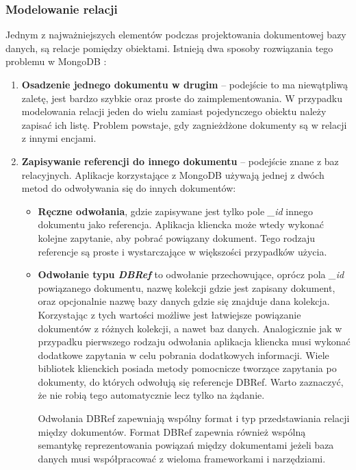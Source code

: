 \subsubsection{Modelowanie relacji}

Jednym z najważniejszych elementów podczas projektowania dokumentowej bazy danych, są relacje pomiędzy obiektami.
Istnieją dwa sposoby rozwiązania tego problemu w MongoDB \cite{MongoDBRefs}:
\begin{enumerate}
    \item \textbf{Osadzenie jednego dokumentu w drugim} -- podejście to ma niewątpliwą zaletę, jest bardzo szybkie oraz proste do zaimplementowania.
    W przypadku modelowania relacji jeden do wielu zamiast pojedynczego obiektu należy zapisać ich listę.
    Problem powstaje, gdy zagnieżdżone dokumenty są w relacji z innymi encjami.
    \item \textbf{Zapisywanie referencji do innego dokumentu} -- podejście znane z baz relacyjnych.
    Aplikacje korzystające z MongoDB używają jednej z dwóch metod do odwoływania się do innych dokumentów:
    \begin{itemize}
        \item \textbf{Ręczne odwołania}, gdzie zapisywane jest tylko pole \textit{\_id} innego dokumentu jako referencja.
        Aplikacja kliencka może wtedy wykonać kolejne zapytanie, aby pobrać powiązany dokument.
        Tego rodzaju referencje są proste i wystarczające w większości przypadków użycia.
        \item \textbf{Odwołanie typu \textit{DBRef}} to odwołanie przechowujące, oprócz pola \textit{\_id} powiązanego dokumentu, nazwę kolekcji gdzie jest zapisany dokument, oraz opcjonalnie nazwę bazy danych gdzie się znajduje dana kolekcja.
        Korzystając z tych wartości możliwe jest łatwiejsze powiązanie dokumentów z różnych kolekcji, a nawet baz danych.
        Analogicznie jak w przypadku pierwszego rodzaju odwołania aplikacja kliencka musi wykonać dodatkowe zapytania w celu pobrania dodatkowych informacji.
        Wiele bibliotek klienckich posiada metody pomocnicze tworzące zapytania po dokumenty, do których odwołują się referencje DBRef.
        Warto zaznaczyć, że nie robią tego automatycznie lecz tylko na żądanie.
        
        Odwołania DBRef zapewniają wspólny format i typ przedstawiania relacji między dokumentów.
        Format DBRef zapewnia również wspólną semantykę reprezentowania powiązań między dokumentami jeżeli baza danych musi współpracować z wieloma frameworkami i narzędziami.
    \end{itemize}
\end{enumerate}

